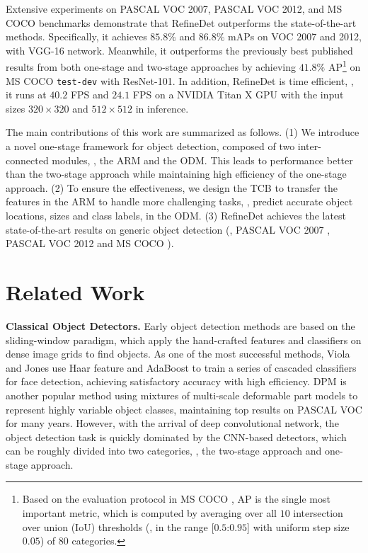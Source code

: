\documentclass[10pt,twocolumn,letterpaper]{article}
\begin{document}
Extensive experiments on PASCAL VOC 2007, PASCAL VOC 2012, and MS COCO benchmarks demonstrate that RefineDet outperforms the state-of-the-art methods. Specifically, it achieves $85.8\%$ and $86.8\%$ mAPs on VOC 2007 and 2012, with VGG-16 network. Meanwhile, it outperforms the previously best published results from both one-stage and two-stage approaches by achieving $41.8\%$ AP\footnote{Based on the evaluation protocol in MS COCO \cite{DBLP:conf/eccv/LinMBHPRDZ14}, AP is the single most important metric, which is computed by averaging over all $10$ intersection over union (IoU) thresholds (\ie, in the range [$0.5$:$0.95$] with uniform step size $0.05$) of $80$ categories.} on MS COCO {\tt test-dev} with ResNet-101. In addition, RefineDet is time efficient, \ie, it runs at $40.2$ FPS and $24.1$ FPS on a NVIDIA Titan X GPU with the input sizes $320\times320$ and $512\times512$ in inference.

The main contributions of this work are summarized as follows. (1) We introduce a novel one-stage framework for object detection, composed of two inter-connected modules, \ie, the ARM and the ODM. This leads to performance better than the two-stage approach while maintaining high efficiency of the one-stage approach. (2) To ensure the effectiveness, we design the TCB to transfer the features in the ARM to handle more challenging tasks, \ie, predict accurate object locations, sizes and class labels, in the ODM. (3) RefineDet achieves the latest state-of-the-art results on generic object detection (\ie, PASCAL VOC 2007 \cite{pascal-voc-2007}, PASCAL VOC 2012 \cite{pascal-voc-2012} and MS COCO \cite{DBLP:conf/eccv/LinMBHPRDZ14}).


\section{Related Work}

{\noindent \textbf{Classical Object Detectors.}} Early object detection methods are based on the sliding-window paradigm, which apply the hand-crafted features and classifiers on dense image grids to find objects. As one of the most successful methods, Viola and Jones \cite{DBLP:conf/cvpr/ViolaJ01} use Haar feature and AdaBoost to train a series of cascaded classifiers for face detection, achieving satisfactory accuracy with high efficiency. DPM \cite{DBLP:journals/pami/FelzenszwalbGMR10} is another popular method using mixtures of multi-scale deformable part models to represent highly variable object classes, maintaining top results on PASCAL VOC \cite{DBLP:journals/ijcv/EveringhamGWWZ10} for many years. However, with the arrival of deep convolutional network, the object detection task is quickly dominated by the CNN-based detectors, which can be roughly divided into two categories, \ie, the two-stage approach and one-stage approach.
\end{document}
